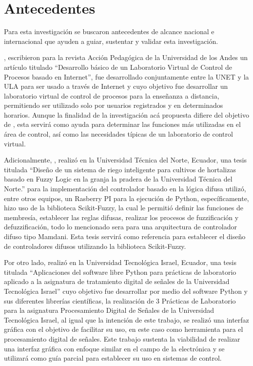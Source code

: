 \section{Antecedentes}
	
	Para esta investigación se buscaron antecedentes de alcance nacional e internacional que ayuden a guiar, sustentar y validar esta investigación.
	
	\textcite{casallas2005desarrollo}, escribieron para la revista Acción Pedagógica de la Universidad de los Andes un artículo titulado \enquote{Desarrollo básico de un Laboratorio Virtual de Control de Procesos basado en Internet}, fue desarrollado conjuntamente entre la UNET y la ULA para ser usado a través de Internet y cuyo objetivo fue desarrollar un laboratorio virtual de control de procesos para la enseñanza a distancia, permitiendo ser utilizado solo por usuarios registrados y en determinados horarios. Aunque la finalidad de la investigación acá propuesta difiere del objetivo de \citeauthor{casallas2005desarrollo}, esta servirá como ayuda para determinar las funciones más utilizadas en el área de control, así como las necesidades típicas de un laboratorio de control virtual.
	
	Adicionalmente, \textcite{salazar2019diseno}, realizó en la Universidad Técnica del Norte, Ecuador, una tesis titulada \enquote{Diseño de un sistema de riego inteligente para cultivos de hortalizas basado en Fuzzy Logic en la granja la pradera de la Universidad Técnica del Norte.} para la implementación del controlador basado en la lógica difusa utilizó, entre otros equipos, un Rasberry PI para la ejecución de Python, específicamente, hizo uso de la biblioteca Scikit-Fuzzy, la cual le permitió definir las funciones de membresía, establecer las reglas difusas, realizar los procesos de fuzzificación y defuzzificación, todo lo mencionado sera para una arquitectura de controlador difuso tipo Mamdani. Esta tesis servirá como referencia para establecer el diseño de controladores difusos utilizando la biblioteca Scikit-Fuzzy.

    Por otro lado, \textcite{congo2018aplicaciones} realizó en la Universidad Tecnológica Israel, Ecuador, una tesis titulada \enquote{Aplicaciones del software libre Python para prácticas de laboratorio aplicado a la asignatura de tratamiento digital de señales de la Universidad Tecnológica Israel} cuyo objetivo fue desarrollar por medio del software Python y sus diferentes librerías científicas, la realización de 3 Prácticas de Laboratorio para la asignatura Procesamiento Digital de Señales de la Universidad Tecnológica Israel, al igual que la intención de este trabajo, se realizó una interfaz gráfica con el objetivo de facilitar su uso, en este caso como herramienta para el procesamiento digital de señales. Este trabajo sustenta la viabilidad de realizar una interfaz gráfica con enfoque similar en el campo de la electrónica y se utilizará como guía parcial para establecer su uso en sistemas de control.
	
